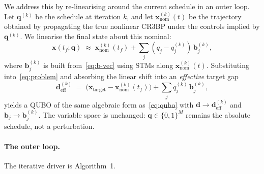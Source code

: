 \documentclass[11pt,a4paper]{article}
\theoremstyle{plain}
\newcommand{\bvec}[1]{\bm{#1}}
\newcommand{\xvec}{\bvec{x}}
\newcommand{\qvec}{\bvec{q}}
\newcommand{\bbvec}{\bvec{b}}
\newcommand{\dvec}{\bvec{d}}
\begin{document}
We address this by re-linearising around the current schedule
in an outer loop. Let $\qvec^{(k)}$ be the schedule at iteration
$k$, and let $\xvec^{(k)}_\mathrm{nom}(t)$ be the trajectory
obtained by propagating the true nonlinear CR3BP under the
controls implied by $\qvec^{(k)}$. We linearise the final state
about this nominal:
\begin{equation}\label{eq:lin-around-q}
  \xvec(t_f; \qvec)
  \;\approx\;
  \xvec^{(k)}_\mathrm{nom}(t_f)
  + \sum_{j} (q_j - q^{(k)}_j)\, \bbvec^{(k)}_j ,
\end{equation}
where $\bbvec^{(k)}_j$ is built from~\eqref{eq:b-vec} using STMs
along $\xvec^{(k)}_\mathrm{nom}(t)$. Substituting
into~\eqref{eq:problem} and absorbing the linear shift into an
\emph{effective} target gap
\begin{equation}\label{eq:d-eff}
  \dvec^{(k)}_\mathrm{eff}
  \;=\;
  \big(\xvec_\mathrm{target} - \xvec^{(k)}_\mathrm{nom}(t_f)\big)
  + \sum_{j} q^{(k)}_j\, \bbvec^{(k)}_j ,
\end{equation}
yields a QUBO of the same algebraic form as~\eqref{eq:qubo} with
$\dvec \to \dvec^{(k)}_\mathrm{eff}$ and $\bbvec_j \to
\bbvec^{(k)}_j$. The variable space is unchanged: $\qvec \in
\{0,1\}^M$ remains the absolute schedule, not a perturbation.

\paragraph{The outer loop.} The iterative driver is
Algorithm~1.
\end{document}
